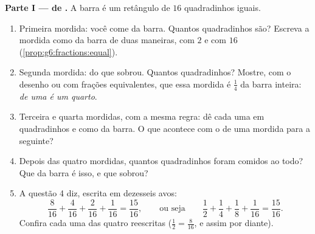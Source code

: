 \begin{problem}
\medskip
\noindent\textbf{Parte I ---  de .}
A barra é um retângulo de $16$ quadradinhos iguais.
\begin{enumerate}
  \item Primeira mordida: você come  da barra. Quantos
        quadradinhos são? Escreva a mordida como  da barra de
        duas maneiras, com  $2$ e com  $16$
        (\cref{prop:g6:fractions:equal}).
  \item Segunda mordida:  do que sobrou. Quantos quadradinhos?
        Mostre, com o desenho ou com frações equivalentes, que essa
        mordida é $\frac14$ da barra inteira: \emph{ de uma
         é um quarto}.
  \item Terceira e quarta mordidas, com a mesma regra: dê cada uma em
        quadradinhos e como  da barra. O que acontece com o
         de uma mordida para a seguinte?
  \item Depois das quatro mordidas, quantos quadradinhos foram comidos
        ao todo? Que  da barra é isso, e que  sobrou?
  \item A questão 4 diz, escrita em dezesseis avos:
        \[
        \frac{8}{16} + \frac{4}{16} + \frac{2}{16} + \frac{1}{16}
        = \frac{15}{16},
        \qquad\text{ou seja}\qquad
        \frac12 + \frac14 + \frac18 + \frac{1}{16}
        = \frac{15}{16} .
        \]
        Confira cada uma das quatro reescritas
        ($\frac12 = \frac{8}{16}$, e assim por diante).
\end{enumerate}


\end{problem}
